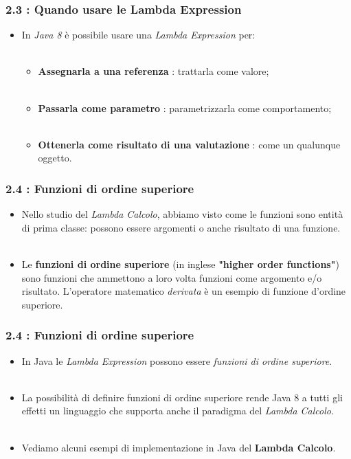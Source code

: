\documentclass{beamer}
\begin{document}
\begin{frame}
	\frametitle{\textbf{2.3 : Quando usare le Lambda Expression}}
	\begin{itemize}
		\item
			In \textit{Java 8} \`e possibile usare una \textit{Lambda Expression} per:\\\
		\begin{itemize}
			\item
				\textbf{Assegnarla a una referenza} : trattarla come valore;\\\
			\item
				\textbf{Passarla come parametro} : parametrizzarla come comportamento;\\\
			\item
				\textbf{Ottenerla come risultato di una valutazione} : come un qualunque oggetto.
		\end{itemize}
	\end{itemize}
\end{frame}


\begin{frame}
	\frametitle{\textbf{2.4 : Funzioni di ordine superiore}}
	\begin{itemize}
		\item
			Nello studio del \textit{Lambda Calcolo}, abbiamo visto come le funzioni sono entità di prima classe: possono essere argomenti o anche risultato di una funzione.\\\
		\item
			Le \textbf{funzioni di ordine superiore} (in inglese \textbf{"higher order functions"}) sono funzioni che ammettono a loro volta funzioni come argomento e/o risultato. L'operatore matematico \emph{derivata} \`e un esempio di funzione d'ordine superiore.
	\end{itemize}
\end{frame}


\begin{frame}
	\frametitle{\textbf{2.4 : Funzioni di ordine superiore}}
	\begin{itemize}
		\item
			In Java le \textit{Lambda Expression} possono essere \textit{funzioni di ordine superiore}.\\\
		\item
			La possibilità di definire funzioni di ordine superiore rende Java 8 a tutti gli effetti un linguaggio che supporta anche il paradigma del \textit{Lambda Calcolo}.\\\	
		\item Vediamo alcuni esempi di implementazione in Java del \textbf{Lambda Calcolo}.
	\end{itemize}
\end{frame}
\end{document}
